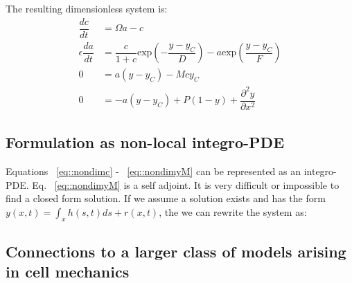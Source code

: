 The resulting dimensionless system is:
\begin{align}
\dfrac{dc}{dt}  & =  \Omega a - c\label{eq::nondimc}\\
\epsilon\dfrac{da}{ dt}  & =  \dfrac{c}{1+c} \mbox{exp}\left(-\dfrac{y-y_C}{D}\right) - a \mbox{exp} \left(\dfrac{y-y_C}{F} \right)\label{eq::nondima}\\
0 & = a(y-y_C) - Mcy_C\label{eq::nondimyC}\\
0 & = -a(y - y_C) + P (1-y) + \dfrac{\partial^2 y}{\partial x^2}\label{eq::nondimyM}
\end{align}

\subsection{Formulation as non-local integro-PDE}
Equations ~\ref{eq::nondimc} - ~\ref{eq::nondimyM} can be represented as an integro-PDE. Eq. ~\ref{eq::nondimyM} is a self adjoint. It is very difficult or impossible to find a closed form solution. If we assume a solution exists and has the form $y(x,t) = \int_x h(s,t) ds + r(x,t)$, the we can rewrite the system as:



\subsection{Connections to a larger class of models arising in cell mechanics}
